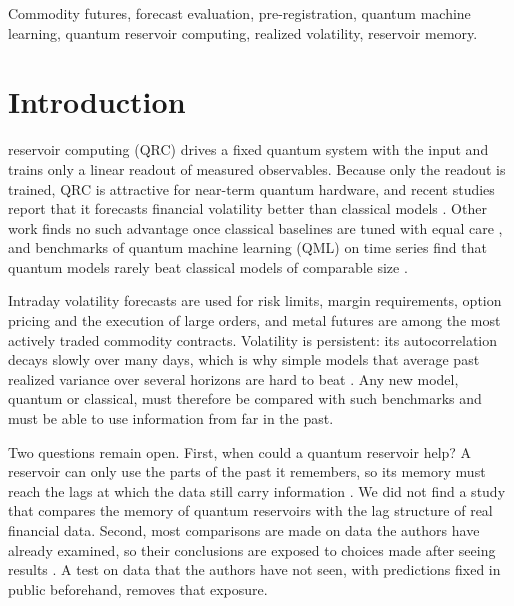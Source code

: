 \documentclass{ieeeaccess}
\begin{document}
\begin{keywords}
Commodity futures, forecast evaluation, pre-registration, quantum machine learning, quantum reservoir computing, realized volatility, reservoir memory.
\end{keywords}

\titlepgskip=-21pt

\maketitle

\section{Introduction}
\label{sec:introduction}
 reservoir computing (QRC) drives a fixed quantum system with the input and trains only a linear readout of measured observables. Because only the readout is trained, QRC is attractive for near-term quantum hardware, and recent studies report that it forecasts financial volatility better than classical models \cite{li2026}. Other work finds no such advantage once classical baselines are tuned with equal care \cite{pandey2026,maheshwari2026b}, and benchmarks of quantum machine learning (QML) on time series find that quantum models rarely beat classical models of comparable size \cite{fellner2026}.

Intraday volatility forecasts are used for risk limits, margin requirements, option pricing and the execution of large orders, and metal futures are among the most actively traded commodity contracts. Volatility is persistent: its autocorrelation decays slowly over many days, which is why simple models that average past realized variance over several horizons are hard to beat \cite{andersen2003,corsi2009}. Any new model, quantum or classical, must therefore be compared with such benchmarks and must be able to use information from far in the past.

Two questions remain open. First, when could a quantum reservoir help? A reservoir can only use the parts of the past it remembers, so its memory must reach the lags at which the data still carry information \cite{dambre2012}. We did not find a study that compares the memory of quantum reservoirs with the lag structure of real financial data. Second, most comparisons are made on data the authors have already examined, so their conclusions are exposed to choices made after seeing results \cite{bowles2024,white2000}. A test on data that the authors have not seen, with predictions fixed in public beforehand, removes that exposure.
\end{document}

